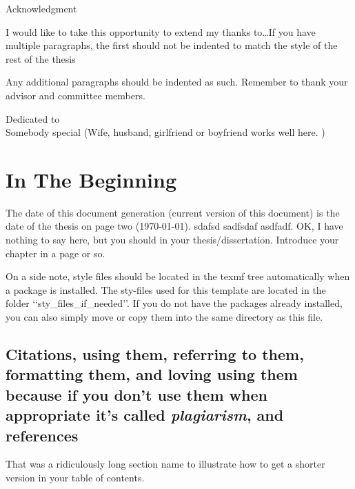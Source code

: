 \documentclass[12pt]{report}
\begin{document}
\begin{singlespace}
\tableofcontents
\listoffigures
\listoftables
\end{singlespace}
%
\newpage
\thispagestyle{plain}
\setlength{\parindent}{0em}
\begin{center}
{\huge Acknowledgment}
\end{center}

I would like to take this opportunity to extend my thanks to\ldots If you have multiple paragraphs, the first should not be indented to match the style of the rest of the thesis

\setlength{\parindent}{2em}
Any additional paragraphs should be indented as such.  Remember to thank your advisor and committee members.
%
\newpage
\thispagestyle{plain}
\vspace*{3in}
\begin{center}
Dedicated to\\
Somebody special (Wife, husband, girlfriend or boyfriend works well
here. )
\end{center}
%
%
%
\newpage
\setcounter{page}{1}
\setlength{\parindent}{2em}
\chapter{In The Beginning}
The date of this document generation (current version of this document) is the date of the thesis on page two (\today).{}
sdafsd sadfsdaf asdfadf. OK, I have nothing to say here, but you should in your thesis/dissertation. Introduce your chapter in a page or so. 

On a side note, style files should be located in the texmf tree automatically when a package is installed.  The sty-files used for this template are located in the folder \lq\lq{}sty\_files\_if\_needed\rq\rq{}.  If you do not have the packages already installed, you can also simply move or copy them into the same directory as this file.

\section[Citations/References (short form of section name)]{Citations, using them, referring to them, formatting them, and loving using them because if you don't use them when appropriate it's called \emph{plagiarism}, and references}
That was a ridiculously long section name to illustrate how to get a shorter version in your table of contents.  
\end{document}
